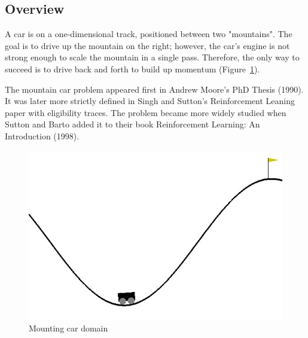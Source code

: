 \documentclass[12pt]{article}
\begin{document}
\subsection{Overview}{A car is on a one-dimensional track, positioned between two "mountains". The goal is to drive up the mountain on the right; however, the car's engine is not strong enough to scale the mountain in a single pass. Therefore, the only way to succeed is to drive back and forth to build up momentum (Figure~\ref{domain_image}).\par
The mountain car problem appeared first in Andrew Moore's PhD Thesis (1990). It was later more strictly defined in Singh and Sutton's Reinforcement Leaning paper with eligibility traces. The problem became more widely studied when Sutton and Barto added it to their book Reinforcement Learning: An Introduction (1998).\par
\begin{figure}[h!]
\begin{center}
\includegraphics[scale=0.5]{images/domain.jpg}
\end{center}
\caption{Mounting car domain}
\label{domain_image}
\end{figure}
}
\end{document}
